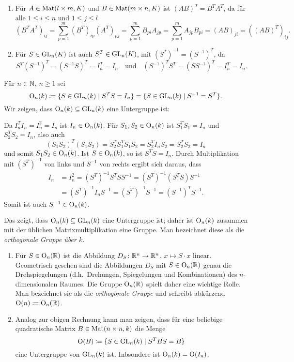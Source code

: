 \begin{bem}
 \begin{enumerate}[leftmargin=*]
  \item
   Für $A \in \mathrm{Mat}(l \times m, K)$ und $B \in \mathrm{Mat}(m \times n, K)$ ist $(AB)^T = B^T A^T$, da für alle $1 \leq i \leq n$ und $1 \leq j \leq l$
   \[
    (B^T A^T)_{ij}
    = \sum_{p=1}^m (B^T)_{ip} (A^T)_{pj}
    = \sum_{p=1}^m B_{pi} A_{jp}
    = \sum_{p=1}^m A_{jp} B_{pi}
    = (AB)_{ji}
    = ((AB)^T)_{ij}.
   \]
  \item
   Für $S \in \mathrm{GL}_n(K)$ ist auch $S^T \in \mathrm{GL}_n(K)$, mit $(S^T)^{-1} = (S^{-1})^T$, da
   \[
    S^T (S^{-1})^T = (S^{-1} S)^T = I_n^T = I_n
    \quad\text{und}\quad
    (S^{-1})^T S^T = (S S^{-1})^T = I_n^T = I_n.
   \]
 \end{enumerate}
\end{bem}

Für $n \in \mathbb{N}$, $n \geq 1$ sei
\[
 \mathrm{O}_n(k)
 \coloneqq \{S \in \mathrm{GL}_n(k) \mid S^T S = I_n\}
 = \{S \in \mathrm{GL}_n(k) \mid S^{-1} = S^T\}.
\]
Wir zeigen, dass $\mathrm{O}_n(k) \subseteq \mathrm{GL}_n(k)$ eine Untergruppe ist:

Da $I_n^T I_n = I_n^2 = I_n$ ist $I_n \in \mathrm{O}_n(k)$. Für $S_1, S_2 \in \mathrm{O}_n(k)$ ist $S_1^T S_1 = I_n$ und $S_2^T S_2 = I_n$, also auch
\[
 (S_1 S_2)^T (S_1 S_2)
 = S_2^T S_1^T S_1 S_2
 = S_2^T I_n S_2
 = S_2^T S_2
 = I_n
\]
und somit $S_1 S_2 \in \mathrm{O}_n(k)$. Ist $S \in \mathrm{O}_n(k)$, so ist $S^T S = I_n$. Durch Multiplikation mit $(S^T)^{-1}$ von links und $S^{-1}$ von rechts ergibt sich daraus, dass
\begin{align*}
 I_n
 &= I_n^2
 = (S^T)^{-1} S^T S S^{-1}
 = (S^T)^{-1} (S^T S) S^{-1} \\
 &= (S^T)^{-1} I_n S^{-1}
 = (S^T)^{-1} S^{-1}
 = (S^{-1})^T S^{-1}.
\end{align*}
Somit ist auch $S^{-1} \in \mathrm{O}_n(k)$.

Das zeigt, dass $\mathrm{O}_n(k) \subseteq \mathrm{GL}_n(k)$ eine Untergruppe ist; daher ist $\mathrm{O}_n(k)$ zusammen mit der üblichen Matrixmultiplikation eine Gruppe. Man bezeichnet diese als die \emph{orthogonale Gruppe über $k$}.

\begin{bem}
 \begin{enumerate}[leftmargin=*]
  \item
   Für $S \in \mathrm{O}_n(\mathbb{R})$ ist die Abbildung $D_S \colon \mathbb{R}^n \to \mathbb{R}^n$, $x \mapsto S \cdot x$ linear. Geometrisch gesehen sind die Abbildungen $D_S$ mit $S \in \mathrm{O}_n(\mathbb{R})$ genau die Drehspiegelungen (d.h.\ Drehungen, Spiegelungen und Kombinationen) des $n$-dimensionalen Raumes. Die Gruppe $\mathrm{O}_n(\mathbb{R})$ spielt daher eine wichtige Rolle. Man bezeichnet sie als die \emph{orthogonale Gruppe} und schreibt abkürzend $\mathrm{O}(n) \coloneqq \mathrm{O}_n(\mathbb{R})$.
  \item
   Analog zur obigen Rechnung kann man zeigen, dass für eine beliebige quadratische Matrix $B \in \mathrm{Mat}(n \times n, k)$ die Menge
   \[
    \mathrm{O}(B) \coloneqq \{S \in \mathrm{GL}_n(k) \mid S^T B S = B\}
   \]
   eine Untergruppe von $\mathrm{GL}_n(k)$ ist. Inbsondere ist $\mathrm{O}_n(k) = \mathrm{O}(I_n)$.
 \end{enumerate}
\end{bem}



